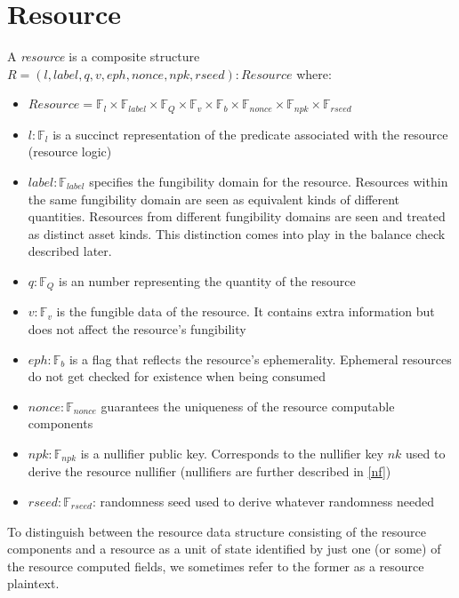 \documentclass[
    11pt,            %
    techreport,        %
    affiltop,       %
]{art}
\begin{document}



\section{Resource}
A \textit{resource} is a composite structure $R = (l, label, q, v, eph, nonce, npk, rseed): Resource$ where:
\begin{itemize}
    \item $Resource = \mathbb{F}_{l} \times \mathbb{F}_{label} \times \mathbb{F}_Q \times \mathbb{F}_{v} \times \mathbb{F}_b \times \mathbb{F}_{nonce} \times  \mathbb{F}_{npk} \times \mathbb{F}_{rseed}$ 
    \item $l: \mathbb{F}_{l}$ is a succinct representation of the predicate associated with the resource (resource logic)
    \item $label: \mathbb{F}_{label}$ specifies the fungibility domain for the resource. Resources within the same fungibility domain are seen as equivalent kinds of different quantities. Resources from different fungibility domains are seen and treated as distinct asset kinds. This distinction comes into play in the balance check described later.
    \item $q: \mathbb{F}_Q$ is an number representing the quantity of the resource
    \item $v: \mathbb{F}_{v}$ is the fungible data of the resource. It contains extra information but does not affect the resource's fungibility
    \item $eph: \mathbb{F}_b$ is a flag that reflects the resource's ephemerality. Ephemeral resources do not get checked for existence when being consumed
    \item $nonce: \mathbb{F}_{nonce}$ guarantees the uniqueness of the resource computable components
    \item $npk: \mathbb{F}_{npk}$ is a nullifier public key. Corresponds to the nullifier key $nk$ used to derive the resource nullifier (nullifiers are further described in \ref{nf})
    \item $rseed: \mathbb{F}_{rseed}$: randomness seed used to derive whatever randomness needed
\end{itemize}

To distinguish between the resource data structure consisting of the resource components and a resource as a unit of state identified by just one (or some) of the resource computed fields, we sometimes refer to the former as a resource plaintext.
\end{document}
